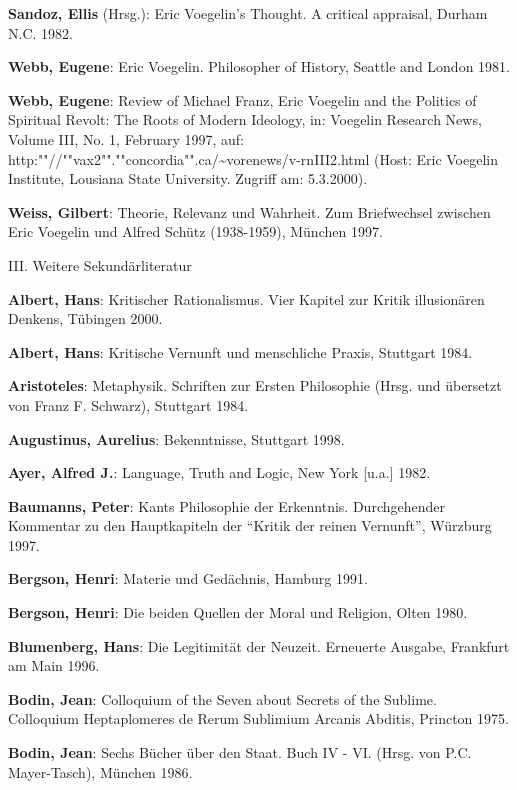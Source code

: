 {\bf Sandoz, Ellis} (Hrsg.): Eric Voegelin's Thought. A critical appraisal,
Durham N.C. 1982.

{\bf Webb, Eugene}: Eric Voegelin. Philosopher of History, Seattle and London
1981.

{\bf Webb, Eugene}: Review of Michael Franz, Eric Voegelin and the
Po\-li\-tics of Spiritual Revolt: The Roots of Modern Ideology, in:
Voe\-ge\-lin Research News, Volume III, No. 1, February 1997, auf:
http:""//""vax2"".""concordia"".ca/\~{ }vorenews/v-rnIII2.html (Host: Eric
Voegelin Institute, Lousiana State University. Zugriff am: 5.3.2000).

{\bf Weiss, Gilbert}: Theorie, Relevanz und Wahrheit. Zum Briefwechsel
zwischen Eric Voegelin und Alfred Schütz (1938-1959), München 1997.



\setlength{\parskip}{5ex}

{\large III. Weitere Sekundärliteratur}

\setlength{\parskip}{3ex}

{\bf Albert, Hans}: Kritischer Rationalismus. Vier Kapitel zur Kritik
illusionären Denkens, Tübingen 2000.

\setlength{\parskip}{1.5ex}

{\bf Albert, Hans}: Kritische Vernunft und menschliche Praxis, Stuttgart 1984.

{\bf Aristoteles}: Metaphysik. Schriften zur Ersten Philosophie (Hrsg. und
übersetzt von Franz F. Schwarz), Stuttgart 1984.

{\bf Augustinus, Aurelius}: Bekenntnisse, Stuttgart 1998.

{\bf Ayer, Alfred J.}: Language, Truth and Logic, New York [u.a.] 1982.

{\bf Baumanns, Peter}: Kants Philosophie der Erkenntnis. Durchgehender
Kommentar zu den Hauptkapiteln der "`Kritik der reinen Vernunft"', Würzburg
1997.

{\bf Bergson, Henri}: Materie und Gedächnis, Hamburg 1991.

{\bf Bergson, Henri}: Die beiden Quellen der Moral und Religion, Olten 1980.

{\bf Blumenberg, Hans}: Die Legitimität der Neuzeit. Erneuerte Ausgabe,
Frankfurt am Main 1996.

{\bf Bodin, Jean}: Colloquium of the Seven about Secrets of the
Sublime. Colloquium Heptaplomeres de Rerum Sublimium Arcanis Abditis, Princton
1975.

{\bf Bodin, Jean}: Sechs Bücher über den Staat. Buch IV - VI. (Hrsg. von
P.C. Mayer-Tasch), München 1986.

